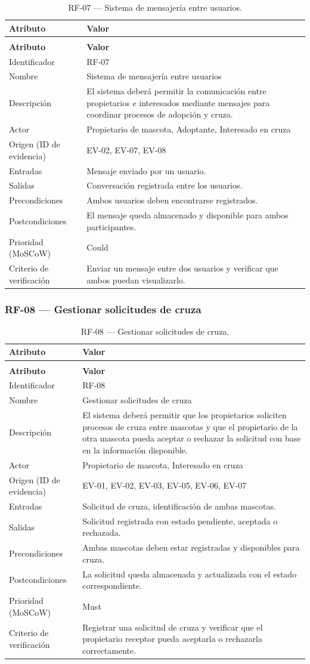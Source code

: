 \documentclass[journal,onecolumn]{IEEEtran}
\makeatletter
\newenvironment{atributos}[2]{%
	\small
	\begin{longtable}{@{}>{\raggedright\arraybackslash}p{4.2cm} >{\raggedright\arraybackslash}p{11.2cm}@{}}
		\caption{#2}\label{tab:#1}\\
		\toprule
		\textbf{Atributo} & \textbf{Valor} \\
		\midrule
		\endfirsthead
		\multicolumn{2}{@{}l}{\small\itshape (continuación)}\\
		\toprule
		\textbf{Atributo} & \textbf{Valor} \\
		\midrule
		\endhead
		\bottomrule
		\endlastfoot
	}{%
	\end{longtable}
	\normalsize
}
\makeatother
\begin{document}
	\begin{atributos}{RF-07}{RF-07 --- Sistema de mensajería entre usuarios.}
		Identificador & RF-07 \\
		Nombre & Sistema de mensajería entre usuarios \\
		Descripción & El sistema deberá permitir la comunicación entre propietarios e interesados mediante mensajes para coordinar procesos de adopción y cruza. \\
		Actor & Propietario de mascota, Adoptante, Interesado en cruza \\
		Origen (ID de evidencia) & EV-02, EV-07, EV-08 \\
		Entradas & Mensaje enviado por un usuario. \\
		Salidas & Conversación registrada entre los usuarios. \\
		Precondiciones & Ambos usuarios deben encontrarse registrados. \\
		Postcondiciones & El mensaje queda almacenado y disponible para ambos participantes. \\
		Prioridad (MoSCoW) & Could \\
		Criterio de verificación & Enviar un mensaje entre dos usuarios y verificar que ambos puedan visualizarlo. \\
	\end{atributos}
	
	\subsubsection{RF-08 --- Gestionar solicitudes de cruza}
	
	\begin{atributos}{RF-08}{RF-08 --- Gestionar solicitudes de cruza.}
		Identificador & RF-08 \\
		Nombre & Gestionar solicitudes de cruza \\
		Descripción & El sistema deberá permitir que los propietarios soliciten procesos de cruza entre mascotas y que el propietario de la otra mascota pueda aceptar o rechazar la solicitud con base en la información disponible. \\
		Actor & Propietario de mascota, Interesado en cruza \\
		Origen (ID de evidencia) & EV-01, EV-02, EV-03, EV-05, EV-06, EV-07 \\
		Entradas & Solicitud de cruza, identificación de ambas mascotas. \\
		Salidas & Solicitud registrada con estado pendiente, aceptada o rechazada. \\
		Precondiciones & Ambas mascotas deben estar registradas y disponibles para cruza. \\
		Postcondiciones & La solicitud queda almacenada y actualizada con el estado correspondiente. \\
		Prioridad (MoSCoW) & Must \\
		Criterio de verificación & Registrar una solicitud de cruza y verificar que el propietario receptor pueda aceptarla o rechazarla correctamente. \\
	\end{atributos}
	
\end{document}
